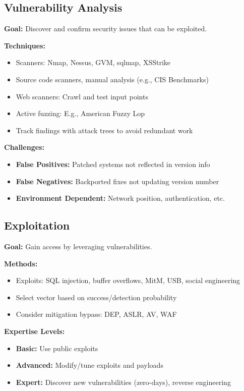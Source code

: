 \subsection{Vulnerability Analysis}
{
\textbf{Goal:} Discover and confirm security issues that can be exploited.

\textbf{Techniques:}
\begin{itemize}[noitemsep]
  \item Scanners: Nmap, Nessus, GVM, sqlmap, XSStrike
  \item Source code scanners, manual analysis (e.g., CIS Benchmarks)
  \item Web scanners: Crawl and test input points
  \item Active fuzzing: E.g., American Fuzzy Lop
  \item Track findings with attack trees to avoid redundant work
\end{itemize}

\textbf{Challenges:}
\begin{itemize}[noitemsep]
  \item \textbf{False Positives:} Patched systems not reflected in version info
  \item \textbf{False Negatives:} Backported fixes not updating version number
  \item \textbf{Environment Dependent:} Network position, authentication, etc.
\end{itemize}
}
\subsection{Exploitation}
{
\textbf{Goal:} Gain access by leveraging vulnerabilities.

\textbf{Methods:}
\begin{itemize}[noitemsep]
  \item Exploits: SQL injection, buffer overflows, MitM, USB, social engineering
  \item Select vector based on success/detection probability
  \item Consider mitigation bypass: DEP, ASLR, AV, WAF
\end{itemize}

\textbf{Expertise Levels:}
\begin{itemize}[noitemsep]
  \item \textbf{Basic:} Use public exploits
  \item \textbf{Advanced:} Modify/tune exploits and payloads
  \item \textbf{Expert:} Discover new vulnerabilities (zero-days), reverse engineering
\end{itemize}
}
